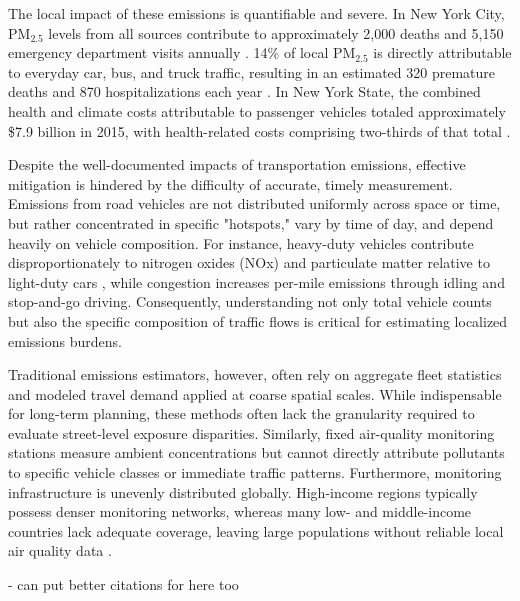 The local impact of these emissions is quantifiable and severe. In New York 
City, $\mathrm{PM_{2.5}}$ levels from all sources contribute to approximately 2,000 deaths 
and 5,150 emergency department visits annually \cite{nyc_department_of_health_and_mental_hygiene_traffic_nodate}. 14\% of local $\mathrm{PM_{2.5}}$ is 
directly attributable to everyday car, bus, and truck traffic, resulting in 
an estimated 320 premature deaths and 870 hospitalizations each year \cite{nyc_department_of_health_and_mental_hygiene_traffic_nodate}. In 
New York State, the combined health and climate costs attributable to passenger
vehicles totaled approximately \$7.9 billion in 2015, with health-related costs 
comprising two-thirds of that total \cite{pinto_de_moura_inequitable_2019}.

Despite the well-documented impacts of transportation emissions, effective 
mitigation is hindered by the difficulty of accurate, timely measurement. 
Emissions from road vehicles are not distributed uniformly across space or 
time, but rather concentrated in specific "hotspots," vary by time of day, 
and depend heavily on vehicle composition. For instance, heavy-duty vehicles 
contribute disproportionately to nitrogen oxides (NOx) and particulate matter 
relative to light-duty cars \cite{wang_high-resolution_2025}, while congestion increases per-mile emissions
through idling and stop-and-go driving. Consequently, understanding not only 
total vehicle counts but also the specific composition of traffic flows is 
critical for estimating localized emissions burdens.

Traditional emissions estimators, however, often rely on aggregate fleet 
statistics and modeled travel demand applied at coarse spatial scales. While 
indispensable for long-term planning, these methods often lack the granularity
required to evaluate street-level exposure disparities. Similarly, fixed 
air-quality monitoring stations measure ambient concentrations but cannot 
directly attribute pollutants to specific vehicle classes or immediate traffic
patterns. Furthermore, monitoring infrastructure is unevenly distributed 
globally. High-income regions typically possess denser monitoring networks,
whereas many low- and middle-income countries lack adequate coverage, leaving
large populations without reliable local air quality data \cite{carvalho_air_2016}.

- can put better citations for here too

